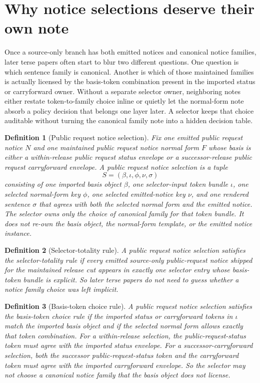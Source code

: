 \documentclass[11pt]{article}
\newtheorem{definition}{Definition}
\begin{document}
\section{Why notice selections deserve their own note}
Once a source-only branch has both emitted notices and canonical notice families, later terse papers often start to blur two different questions.
One question is which sentence family is canonical.
Another is which of those maintained families is actually licensed by the basis-token combination present in the imported status or carryforward owner.
Without a separate selector owner, neighboring notes either restate token-to-family choice inline or quietly let the normal-form note absorb a policy decision that belongs one layer later.
A selector keeps that choice auditable without turning the canonical family note into a hidden decision table.

\begin{definition}[Public request notice selection]
Fix one emitted public request notice $N$ and one maintained public request notice normal form $F$ whose basis is either a within-release public request status envelope or a successor-release public request carryforward envelope.
A \emph{public request notice selection} is a tuple
\[
S=(\beta,\iota,\phi,\nu,\sigma)
\]
consisting of one imported basis object $\beta$, one selector-input token bundle $\iota$, one selected normal-form key $\phi$, one selected emitted-notice key $\nu$, and one rendered sentence $\sigma$ that agrees with both the selected normal form and the emitted notice.
The selector owns only the choice of canonical family for that token bundle.
It does not re-own the basis object, the normal-form template, or the emitted notice instance.
\end{definition}

\begin{definition}[Selector-totality rule]
A public request notice selection satisfies the \emph{selector-totality rule} if every emitted source-only public-request notice shipped for the maintained release cut appears in exactly one selector entry whose basis-token bundle is explicit.
So later terse papers do not need to guess whether a notice family choice was left implicit.
\end{definition}

\begin{definition}[Basis-token choice rule]
A public request notice selection satisfies the \emph{basis-token choice rule} if the imported status or carryforward tokens in $\iota$ match the imported basis object and if the selected normal form allows exactly that token combination.
For a within-release selection, the public-request-status token must agree with the imported status envelope.
For a successor-carryforward selection, both the successor public-request-status token and the carryforward token must agree with the imported carryforward envelope.
So the selector may not choose a canonical notice family that the basis object does not license.
\end{definition}
\end{document}
